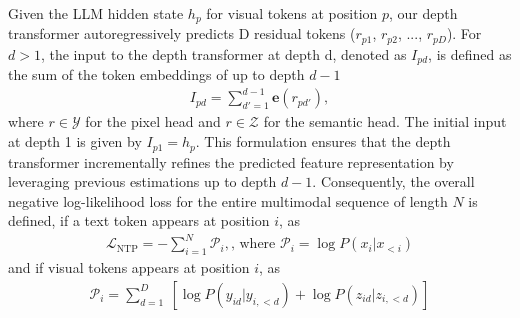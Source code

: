 Given the LLM hidden state $h_p$ for visual tokens at position $p$, our depth transformer autoregressively predicts D residual tokens ($r_{p1}$, $r_{p2}$, ..., $r_{pD}$). For $d > 1$, the input to the depth transformer at depth d, denoted as $I_{pd}$, is defined as the sum of the token embeddings of up to depth $d-1$ 
\begin{equation}
\begin{aligned}
  I_{pd} = \sum_{d'=1}^{d-1} \mathbf{e}(r_{pd'}),
\end{aligned}
\end{equation}
where $r\in\mathcal{Y}$ for the pixel head and $r\in\mathcal{Z}$ for the semantic head. The initial input at depth 1 is given by $I_{p1} = h_p$. This formulation ensures that the depth transformer incrementally refines the predicted feature representation by leveraging previous estimations up to depth $d-1$.
Consequently, the overall negative log-likelihood loss for the entire multimodal sequence of length $N$ is defined, if a text token appears at position $i$, as
\begin{equation}
\begin{aligned}
  \mathcal{L}_\text{NTP} = -\sum_{i=1}^N\mathcal{P}_i, 
\text{, where } \mathcal{P}_i = \log P\left(x_i|x_{<i}\right)
\end{aligned}
\end{equation}
 and if visual tokens appears at position $i$, as
\begin{equation}
\begin{aligned}
    \mathcal{P}_i = \sum_{d=1}^D~[\log P\left(y_{id}|y_{i,<d}\right)+\log P\left(z_{id}|z_{i,<d}\right)]
\end{aligned}
\end{equation}


